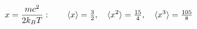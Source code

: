 \documentclass[preview]{standalone}
\begin{document}
\begin{align*}
\special{dvisvgm:raw <g id='unique000'>}x=\frac{mc^2}{2k_BT}:\qquad \langle x\rangle=\tfrac32,\quad\langle x^2\rangle=\tfrac{15}{4},\quad\langle x^3\rangle=\tfrac{105}{8}\special{dvisvgm:raw </g>}
\end{align*}
\end{document}
